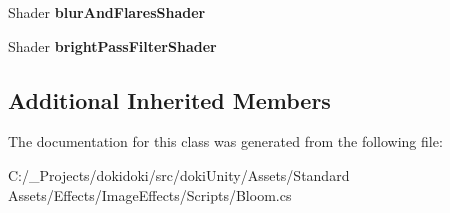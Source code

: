\begin{DoxyCompactItemize}
\item 
Shader {\bfseries blur\+And\+Flares\+Shader}\hypertarget{class_unity_standard_assets_1_1_image_effects_1_1_bloom_a9b5496f4e7fdf06fd188341758dbd47b}{}\label{class_unity_standard_assets_1_1_image_effects_1_1_bloom_a9b5496f4e7fdf06fd188341758dbd47b}

\item 
Shader {\bfseries bright\+Pass\+Filter\+Shader}\hypertarget{class_unity_standard_assets_1_1_image_effects_1_1_bloom_a686baeb3603571e21ee795413da4cdcb}{}\label{class_unity_standard_assets_1_1_image_effects_1_1_bloom_a686baeb3603571e21ee795413da4cdcb}

\end{DoxyCompactItemize}
\subsection*{Additional Inherited Members}


The documentation for this class was generated from the following file\+:\begin{DoxyCompactItemize}
\item 
C\+:/\+\_\+\+Projects/dokidoki/src/doki\+Unity/\+Assets/\+Standard Assets/\+Effects/\+Image\+Effects/\+Scripts/Bloom.\+cs\end{DoxyCompactItemize}
